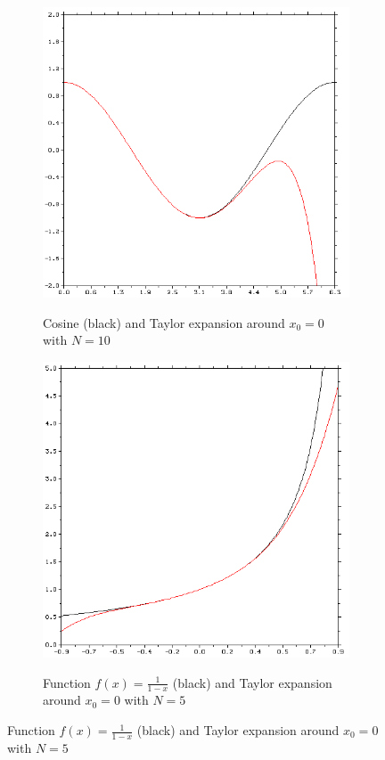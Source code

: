 \begin{figure}
    \begin{subfigure}[h]{0.4\textwidth}
        \centering
        \includegraphics[width = \textwidth]{./doc/Figures/Taylor1.png}  \\
        \caption{Cosine (black) and Taylor expansion around $x_0 = 0$ with $N = 10$}
        \label{fig:Taylor1}
    \end{subfigure}
    \hspace{\fill}
    \begin{subfigure}[h]{0.4\textwidth}
        \centering
        \includegraphics[width = \textwidth]{./doc/Figures/Taylor2.png}  \\
        \caption{Function $f(x) = \frac{1}{1-x}$ (black) and Taylor expansion around $x_0 = 0$ with $N = 5$}
        \label{fig:Taylor2}
    \end{subfigure}    


\end{figure}
